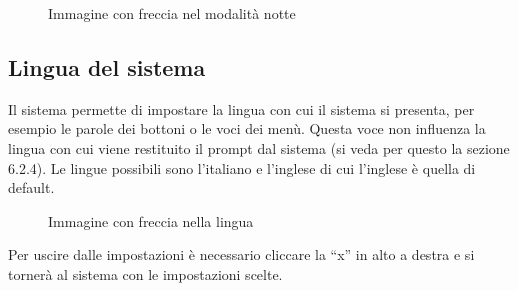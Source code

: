\begin{figure}[H]
    \centering
    \caption{Immagine con freccia nel modalità notte}
  \end{figure}

\subsection{Lingua del sistema}

Il sistema permette di impostare la lingua con cui il sistema si presenta, per esempio le parole dei bottoni o le voci dei menù. Questa voce non influenza la lingua con cui viene restituito il prompt dal sistema (si veda per questo la sezione 6.2.4). Le lingue possibili sono l'italiano e l'inglese di cui l'inglese è quella di default.

\begin{figure}[H]
    \centering
    \caption{Immagine con freccia nella lingua}
  \end{figure}

Per uscire dalle impostazioni è necessario cliccare la ``x'' in alto a destra e si tornerà al sistema con le impostazioni scelte.
